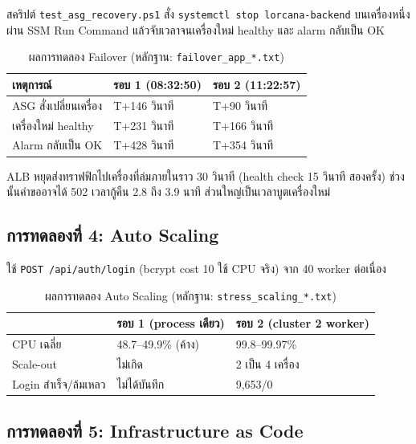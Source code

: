 สคริปต์ \texttt{test\_asg\_recovery.ps1} สั่ง \texttt{systemctl stop lorcana-backend} บนเครื่องหนึ่งผ่าน SSM Run Command แล้วจับเวลาจนเครื่องใหม่ healthy และ alarm กลับเป็น OK

\begin{table}[H]
\centering
\caption{ผลการทดลอง Failover (หลักฐาน: \texttt{failover\_app\_*.txt})}
\begin{tabularx}{\textwidth}{lXX}
\toprule
\textbf{เหตุการณ์} & \textbf{รอบ 1 (08:32:50)} & \textbf{รอบ 2 (11:22:57)} \\
\midrule
ASG สั่งเปลี่ยนเครื่อง & T+146 วินาที & T+90 วินาที \\
เครื่องใหม่ healthy & T+231 วินาที & T+166 วินาที \\
Alarm กลับเป็น OK & T+428 วินาที & T+354 วินาที \\
\bottomrule
\end{tabularx}
\end{table}

ALB หยุดส่งทราฟฟิกไปเครื่องที่ล่มภายในราว 30 วินาที (health check 15 วินาที สองครั้ง) ช่วงนั้นคำขออาจได้ 502 เวลากู้คืน 2.8 ถึง 3.9 นาที ส่วนใหญ่เป็นเวลาบูตเครื่องใหม่

\subsection{การทดลองที่ 4: Auto Scaling}

ใช้ \texttt{POST /api/auth/login} (bcrypt cost 10 ใช้ CPU จริง) จาก 40 worker ต่อเนื่อง

\begin{table}[H]
\centering
\caption{ผลการทดลอง Auto Scaling (หลักฐาน: \texttt{stress\_scaling\_*.txt})}
\begin{tabularx}{\textwidth}{lXX}
\toprule
& \textbf{รอบ 1 (process เดียว)} & \textbf{รอบ 2 (cluster 2 worker)} \\
\midrule
CPU เฉลี่ย & 48.7--49.9\% (ค้าง) & 99.8--99.97\% \\
Scale-out & ไม่เกิด & 2 เป็น 4 เครื่อง \\
Login สำเร็จ/ล้มเหลว & ไม่ได้บันทึก & 9,653/0 \\
\bottomrule
\end{tabularx}
\end{table}

\subsection{การทดลองที่ 5: Infrastructure as Code}

